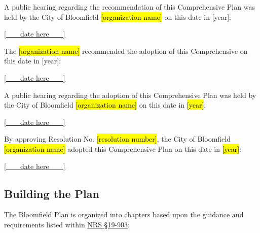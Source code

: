 \pagebreak

\noindent A public hearing regarding the recommendation of this Comprehensive Plan was held by the City of Bloomfield \hl{[organization name]} on this date in [year]:\\

\setlength{\hsize}{0.9\hsize}%
\begin{flushright}
\underline{[\,\,\,\,\,\,\,\,\,\,   
            date here     
            \,\,\,\,\,\,\,\,\,\,]
            }
\end{flushright}

\noindent The \hl{[organization name]} recommended the adoption of this Comprehensive on this date in [year]:
\begin{flushright}
\underline{[\,\,\,\,\,\,\,\,\,\,   
            date here     
            \,\,\,\,\,\,\,\,\,\,]
            }
\end{flushright}

\noindent A public hearing regarding the adoption of this Comprehensive Plan was held by the City of Bloomfield \hl{[organization name]} on this date in \hl{[year]}:

\begin{flushright}
\underline{[\,\,\,\,\,\,\,\,\,\,   
            date here     
            \,\,\,\,\,\,\,\,\,\,]
            }
\end{flushright}

\noindent By approving Resolution No. \hl{[resolution number]}, the City of Bloomfield \hl{[organization name]} adopted this Comprehensive Plan on this date in \hl{[year]}:

\begin{flushright}
\underline{[\,\,\,\,\,\,\,\,\,\,   
            date here     
            \,\,\,\,\,\,\,\,\,\,]
            }
\end{flushright}

\pagebreak

\subsection{Building the Plan}
\noindent The Bloomfield Plan is organized into chapters based upon the guidance and requirements listed within \href{https://nebraskalegislature.gov/laws/statutes.php?statute=19-903}{NRS \S 19-903}:

